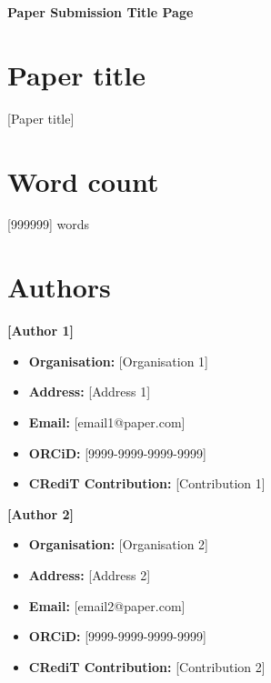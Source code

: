 \documentclass[10pt]{article}
\newcommand{\AddMore}[1]{{\color{red}[#1]}}
\newcommand{\mylinespread}{1.18}  %
\begin{document}
\renewcommand{\baselinestretch}{\mylinespread}\selectfont
\setcounter{page}{1}

\begin{center}
{\LARGE \textbf{Paper Submission Title Page}}
\vspace{-0.75em}
\end{center}

\section{Paper title}
\AddMore{Paper title}

\section{Word count}
\AddMore{999999} words

\section{Authors}
{\large\textbf{\AddMore{Author 1}}}
\begin{itemize}
    \item \textbf{Organisation:} \AddMore{Organisation 1}
    \item \textbf{Address:} \AddMore{Address 1}
    \item \textbf{Email:} \AddMore{email1@paper.com}
    \item \textbf{ORCiD:} \AddMore{9999-9999-9999-9999}
    \item \textbf{CRediT Contribution:} \AddMore{Contribution 1}
\end{itemize}

{\large\textbf{\AddMore{Author 2}}}
\begin{itemize}
    \item \textbf{Organisation:} \AddMore{Organisation 2}
    \item \textbf{Address:} \AddMore{Address 2}
    \item \textbf{Email:} \AddMore{email2@paper.com}
    \item \textbf{ORCiD:} \AddMore{9999-9999-9999-9999}
    \item \textbf{CRediT Contribution:} \AddMore{Contribution 2}
\end{itemize}

\end{document}
